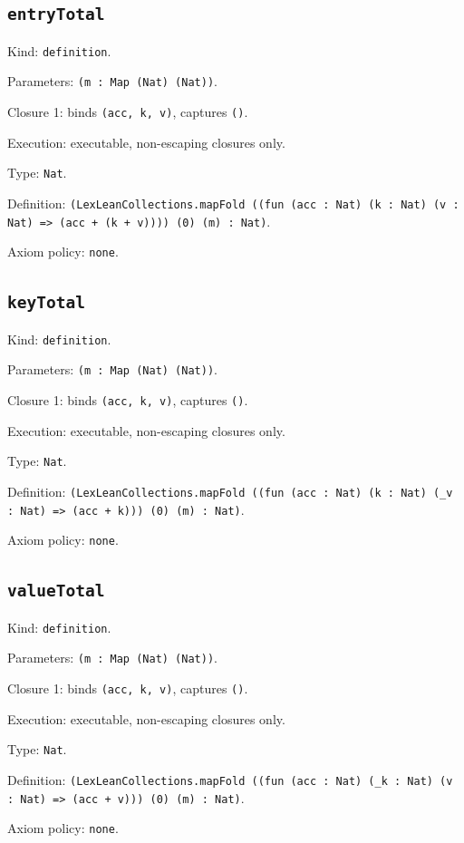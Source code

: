 \documentclass[11pt]{article}
\begin{document}
\subsection*{\texttt{entryTotal}}
\noindent Kind: \texttt{definition}.\par
\noindent Parameters: \texttt{(m : Map (Nat) (Nat))}.\par
\noindent Closure 1: binds \texttt{(acc, k, v)}, captures \texttt{()}.\par
\noindent Execution: executable, non-escaping closures only.\par
\noindent Type: \texttt{Nat}.\par
\noindent Definition: \texttt{(LexLeanCollections.mapFold ((fun (acc : Nat) (k : Nat) (v : Nat) => (acc + (k + v)))) (0) (m) : Nat)}.\par
\noindent Axiom policy: \texttt{none}.\par
\subsection*{\texttt{keyTotal}}
\noindent Kind: \texttt{definition}.\par
\noindent Parameters: \texttt{(m : Map (Nat) (Nat))}.\par
\noindent Closure 1: binds \texttt{(acc, k, v)}, captures \texttt{()}.\par
\noindent Execution: executable, non-escaping closures only.\par
\noindent Type: \texttt{Nat}.\par
\noindent Definition: \texttt{(LexLeanCollections.mapFold ((fun (acc : Nat) (k : Nat) (\_v : Nat) => (acc + k))) (0) (m) : Nat)}.\par
\noindent Axiom policy: \texttt{none}.\par
\subsection*{\texttt{valueTotal}}
\noindent Kind: \texttt{definition}.\par
\noindent Parameters: \texttt{(m : Map (Nat) (Nat))}.\par
\noindent Closure 1: binds \texttt{(acc, k, v)}, captures \texttt{()}.\par
\noindent Execution: executable, non-escaping closures only.\par
\noindent Type: \texttt{Nat}.\par
\noindent Definition: \texttt{(LexLeanCollections.mapFold ((fun (acc : Nat) (\_k : Nat) (v : Nat) => (acc + v))) (0) (m) : Nat)}.\par
\noindent Axiom policy: \texttt{none}.\par
\end{document}
